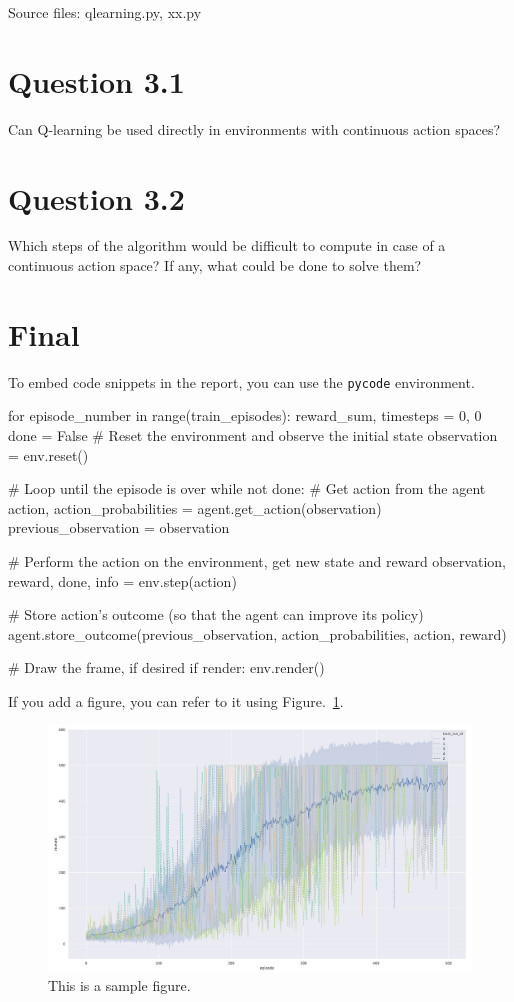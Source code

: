 \documentclass[12pt]{article}
\begin{document}
\noindent
Source files: qlearning.py, xx.py 

\section*{Question 3.1}

Can Q-learning be used directly in environments with continuous
action spaces?

\section*{Question 3.2}

Which steps of the algorithm would be difficult to compute in case of
a continuous action space? If any, what could be done to solve them?


\pagebreak

\section*{Final}

To embed code snippets in the report, you can use the \texttt{pycode} environment.

\begin{pycode}
for episode_number in range(train_episodes):
    reward_sum, timesteps = 0, 0
    done = False
    # Reset the environment and observe the initial state
    observation = env.reset()

    # Loop until the episode is over
    while not done:
        # Get action from the agent
        action, action_probabilities = agent.get_action(observation)
        previous_observation = observation

        # Perform the action on the environment, get new state and reward
        observation, reward, done, info = env.step(action)

        # Store action's outcome (so that the agent can improve its policy)
        agent.store_outcome(previous_observation, action_probabilities, action, reward)

        # Draw the frame, if desired
        if render:
            env.render()
\end{pycode}

If you add a figure, you can refer to it using Figure.~\ref*{fig:fig1}.

\begin{figure}[h] 
	\centering  %
    \includegraphics[width=0.9\columnwidth]{img/training.pdf}
	\caption{This is a sample figure.}
	\label{fig:fig1}
\end{figure}


\end{document}
